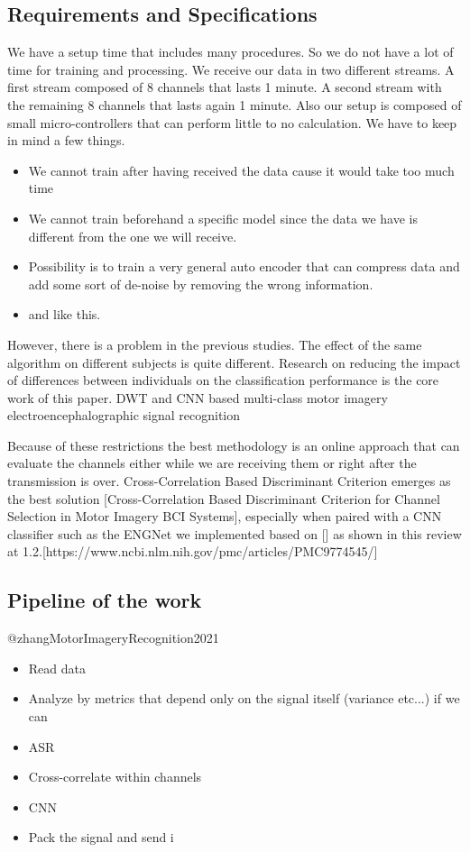 \documentclass{article}
\begin{document}
\subsection{Requirements and Specifications}

We have a setup time that includes many procedures.
So we do not have a lot of time for training and processing.
We receive our data in two different streams.
A first stream composed of 8 channels that lasts 1 minute.
A second stream with the remaining 8 channels that lasts again 1 minute.
Also our setup is composed of small micro-controllers that can perform little to no calculation.
We have to keep in mind a few things.
\begin{itemize}
\item We cannot train after having received the data cause it would take too much time
\item We cannot train beforehand a specific model since the data we have is different from the one we will receive.
\item Possibility is to train a very general auto encoder that can compress data and add some sort of de-noise by removing the wrong information.
\item and like this.
\end{itemize}

However, there is a problem in the previous studies. The effect of the same algorithm on different subjects is quite different. Research on reducing the impact of differences between individuals on the classification performance is the core work of this paper.
{DWT and CNN based multi-class motor imagery electroencephalographic signal recognition}

Because of these restrictions the best methodology is an online approach that can evaluate the channels either while we are receiving them or right after the transmission is over.
Cross-Correlation Based Discriminant Criterion emerges as the best solution [Cross-Correlation Based Discriminant Criterion for
Channel Selection in Motor Imagery BCI Systems], especially when paired with a CNN classifier such as the ENGNet we implemented based on [] as shown in this review at 1.2.[https://www.ncbi.nlm.nih.gov/pmc/articles/PMC9774545/]


\subsection{Pipeline of the work}
@zhangMotorImageryRecognition2021

\begin{itemize}
\item Read data
\item Analyze by metrics that depend only on the signal itself (variance etc...) if we can
\item ASR 
\item Cross-correlate within channels
\item CNN
\item Pack the signal and send i
\end{itemize}
\end{document}

